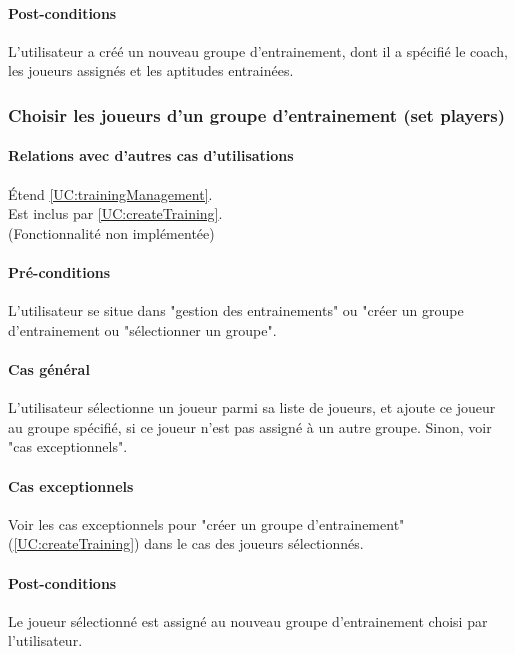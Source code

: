 \paragraph{Post-conditions}
\begin{list}{}{\leftmargin=1.5em}
\item{L'utilisateur a créé un nouveau groupe d'entrainement, dont il a spécifié le coach, les joueurs assignés et les aptitudes entrainées.}
\end{list}

\subsubsection{Choisir les joueurs d'un groupe d'entrainement (set players)}
\label{UC:addPlayerToGroup}
\paragraph{Relations avec d'autres cas d'utilisations}
Étend \ref{UC:trainingManagement}.\\
Est inclus par \ref{UC:createTraining}.
\\(Fonctionnalité non implémentée)
\paragraph{Pré-conditions}
\begin{list}{}{\leftmargin=1.5em}
\item{L'utilisateur se situe dans "gestion des entrainements" ou "créer un groupe d'entrainement ou "sélectionner un groupe".}
\end{list}
\paragraph{Cas général}
L'utilisateur sélectionne un joueur parmi sa liste de joueurs, et ajoute ce joueur au groupe spécifié, si ce joueur n'est pas assigné à un autre groupe. Sinon, voir "cas exceptionnels". 
\paragraph{Cas exceptionnels}
Voir les cas exceptionnels pour "créer un groupe d'entrainement" (\ref{UC:createTraining}) dans le cas des joueurs sélectionnés.
\paragraph{Post-conditions}
\begin{list}{}{\leftmargin=1.5em}
\item{Le joueur sélectionné est assigné au nouveau groupe d'entrainement choisi par l'utilisateur.}
\end{list}

